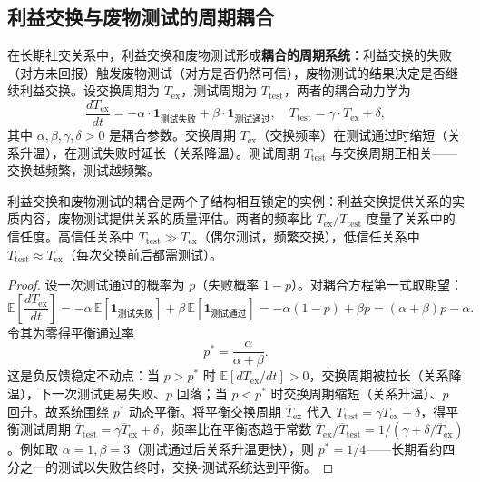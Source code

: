 \subsection{利益交换与废物测试的周期耦合}

\begin{proposition}[交换-测试的复合周期]\label{prop:exchange_test_coupling}
在长期社交关系中，利益交换和废物测试形成\textbf{耦合的周期系统}：利益交换的失败（对方未回报）触发废物测试（对方是否仍然可信），废物测试的结果决定是否继续利益交换。设交换周期为 $T_{\text{ex}}$，测试周期为 $T_{\text{test}}$，两者的耦合动力学为
\[
\frac{dT_{\text{ex}}}{dt} = -\alpha \cdot \mathbf{1}_{\text{测试失败}} + \beta \cdot \mathbf{1}_{\text{测试通过}}, \quad T_{\text{test}} = \gamma \cdot T_{\text{ex}} + \delta,
\]
其中 $\alpha, \beta, \gamma, \delta > 0$ 是耦合参数。交换周期 $T_{\text{ex}}$（交换频率）在测试通过时缩短（关系升温），在测试失败时延长（关系降温）。测试周期 $T_{\text{test}}$ 与交换周期正相关——交换越频繁，测试越频繁。

利益交换和废物测试的耦合是两个子结构相互锁定的实例：利益交换提供关系的实质内容，废物测试提供关系的质量评估。两者的频率比 $T_{\text{ex}}/T_{\text{test}}$ 度量了关系中的信任度。高信任关系中 $T_{\text{test}} \gg T_{\text{ex}}$（偶尔测试，频繁交换），低信任关系中 $T_{\text{test}} \approx T_{\text{ex}}$（每次交换前后都需测试）。
\end{proposition}

\begin{proof}
设一次测试通过的概率为 $p$（失败概率 $1-p$）。对耦合方程第一式取期望：
\[
\mathbb{E}\left[\frac{dT_{\text{ex}}}{dt}\right] = -\alpha\,\mathbb{E}[\mathbf{1}_{\text{测试失败}}] + \beta\,\mathbb{E}[\mathbf{1}_{\text{测试通过}}] = -\alpha(1-p) + \beta p = (\alpha+\beta)p - \alpha.
\]
令其为零得平衡通过率
\[
p^* = \frac{\alpha}{\alpha+\beta}.
\]
这是负反馈稳定不动点：当 $p > p^*$ 时 $\mathbb{E}[dT_{\text{ex}}/dt] > 0$，交换周期被拉长（关系降温），下一次测试更易失败、$p$ 回落；当 $p < p^*$ 时交换周期缩短（关系升温）、$p$ 回升。故系统围绕 $p^*$ 动态平衡。将平衡交换周期 $\overline{T}_{\text{ex}}$ 代入 $T_{\text{test}} = \gamma T_{\text{ex}} + \delta$，得平衡测试周期 $\overline{T}_{\text{test}} = \gamma\overline{T}_{\text{ex}} + \delta$，频率比在平衡态趋于常数 $\overline{T}_{\text{ex}}/\overline{T}_{\text{test}} = 1/(\gamma + \delta/\overline{T}_{\text{ex}})$。例如取 $\alpha=1, \beta=3$（测试通过后关系升温更快），则 $p^* = 1/4$——长期看约四分之一的测试以失败告终时，交换-测试系统达到平衡。
\end{proof}

